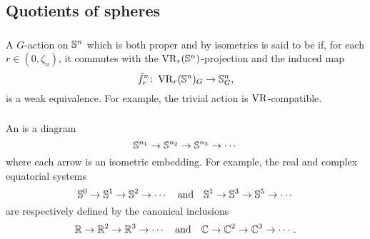\subsection{Quotients of spheres}

\subsubsection{}

A \(G\)-action on \(\mathbb{S}^n\) which is both proper and by isometries is said to be  if, for each $r \in (0, \zeta_n)$, it commutes with the \(\operatorname{VR}_r(\mathbb{S}^n)\)-projection and the induced map
\[
\tilde f_r^n \colon \operatorname{VR}_r(\mathbb{S}^n)_G \to \mathbb{S}^n_G,
\]
is a weak equivalence.
For example, the trivial action is \(\operatorname{VR}\)-compatible.



\subsubsection{}

An  is a diagram
\[
\mathbb{S}^{n_1} \to \mathbb{S}^{n_2} \to \mathbb{S}^{n_3} \to \dotsb
\]
where each arrow is an isometric embedding.
For example, the real and complex equatorial systems
\[
\mathbb{S}^0 \to \mathbb{S}^1 \to \mathbb{S}^2 \to \dotsb
\quad\text{and}\quad
\mathbb{S}^1 \to \mathbb{S}^3 \to \mathbb{S}^5 \to \dotsb
\]
are respectively defined by the canonical inclusions
\[
\mathbb{R} \to \mathbb{R}^2 \to \mathbb{R}^3 \to \dotsb
\quad\text{and}\quad
\mathbb{C} \to \mathbb{C}^2 \to \mathbb{C}^3 \to \dotsb.
\]

